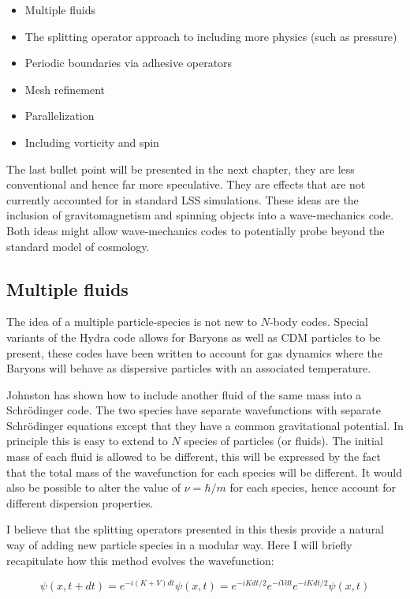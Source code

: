 \begin{itemize}
\item Multiple fluids
\item The splitting operator approach to including more physics (such as pressure)
\item Periodic boundaries via adhesive operators
\item Mesh refinement
\item Parallelization
\item Including vorticity and spin
\end{itemize}

\noindent The last bullet point will be presented in the next chapter, they are less conventional and hence far more speculative. They are effects that are not currently accounted for in standard LSS simulations. These ideas are the inclusion of gravitomagnetism and spinning objects into a wave-mechanics code. Both ideas might allow wave-mechanics codes to potentially probe beyond the standard model of cosmology.


\subsection{Multiple fluids}
The idea of a multiple particle-species is not new to $N$-body codes. Special variants \citep{bib_hmpc1} of the Hydra code \citep{bib_hmpc} allows for Baryons as well as CDM particles to be present, these codes have been written to account for gas dynamics where the Baryons will behave as dispersive particles with an associated temperature.

Johnston has shown how to include another fluid of the same mass into a Schr\"odinger code. The two species have separate wavefunctions with separate Schr\"odinger equations except that they have a common gravitational potential. In principle this is easy to extend to $N$ species of particles (or fluids). The initial mass of each fluid is allowed to be different, this will be expressed by the fact that the total mass of the wavefunction for each species will be different. It would also be possible to alter the value of $\nu = \hbar/m$ for each species, hence account for different dispersion properties.

I believe that the splitting operators presented in this thesis provide a natural way of adding new particle species in a modular way. Here I will briefly recapitulate how this method evolves the wavefunction:

\begin{equation}
\psi(x, t+dt) = e^{-i (K+V) dt} \psi(x, t) = e^{-i K dt/2}e^{-i V dt}e^{-i K dt/2} \psi(x, t)
\end{equation}

